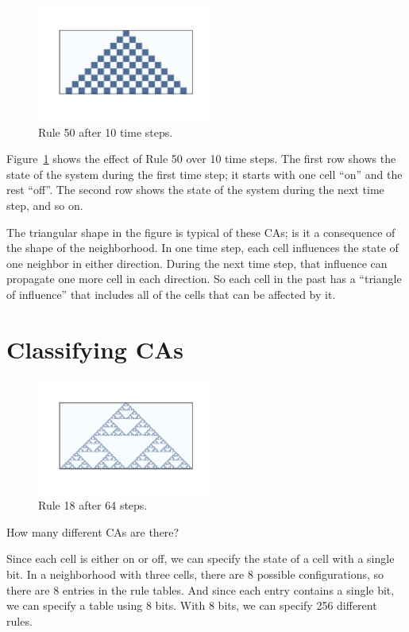 \documentclass[12pt]{book}
\theoremstyle{exercise}
\begin{document}
\begin{figure}
\centerline{\includegraphics[height=1.5in]{figs/chap05-1.pdf}}
\caption{Rule 50 after 10 time steps.}
\label{chap05-1}
\end{figure}

Figure~\ref{chap05-1} shows the effect of Rule 50 over 10
time steps.  The first row shows the state of the system during the first
time step; it starts with one cell ``on'' and the rest ``off''.
The second row shows the state of the system during the
next time step, and so on.

The triangular shape in the figure is typical of these CAs; is it a
consequence of the shape of the neighborhood.  In one time step, each
cell influences the state of one neighbor in either direction.  During
the next time step, that influence can propagate one more cell in each
direction.  So each cell in the past has a ``triangle of influence''
that includes all of the cells that can be affected by it.


\section{Classifying CAs}

\begin{figure}
\centerline{\includegraphics[height=1.5in]{figs/chap05-3.pdf}}
\caption{Rule 18 after 64 steps.}
\label{chap05-3}
\end{figure}

How many different CAs are there?

Since each cell is either on or off, we can specify the state
of a cell with a single bit.  In a neighborhood with three cells,
there are 8 possible configurations, so there are 8 entries
in the rule tables.  And since each entry contains a single bit,
we can specify a table using 8 bits.  With 8 bits, we can
specify 256 different rules.
\end{document}
